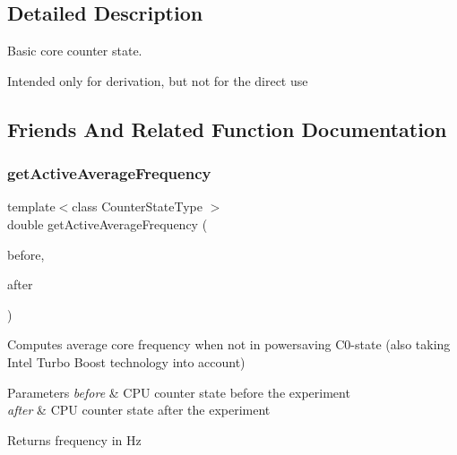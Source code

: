 \subsection{Detailed Description}
Basic core counter state. 

Intended only for derivation, but not for the direct use 

\subsection{Friends And Related Function Documentation}
\mbox{\label{class_basic_counter_state_a963d78be64ccddb4f7686405ef4df9c1}} 
\subsubsection{\texorpdfstring{get\+Active\+Average\+Frequency}{getActiveAverageFrequency}}
{\footnotesize\ttfamily template$<$class Counter\+State\+Type $>$ \\
double get\+Active\+Average\+Frequency (\begin{DoxyParamCaption}\item[{const Counter\+State\+Type \&}]{before,  }\item[{const Counter\+State\+Type \&}]{after }\end{DoxyParamCaption})\hspace{0.3cm}{\ttfamily [friend]}}



Computes average core frequency when not in powersaving C0-\/state (also taking Intel Turbo Boost technology into account) 


\begin{DoxyParams}{Parameters}
{\em before} & C\+PU counter state before the experiment \\
\hline
{\em after} & C\+PU counter state after the experiment \\
\hline
\end{DoxyParams}
\begin{DoxyReturn}{Returns}
frequency in Hz 
\end{DoxyReturn}
\mbox{\label{class_basic_counter_state_a9a351e598b8af26131611ff37b592633}} 

